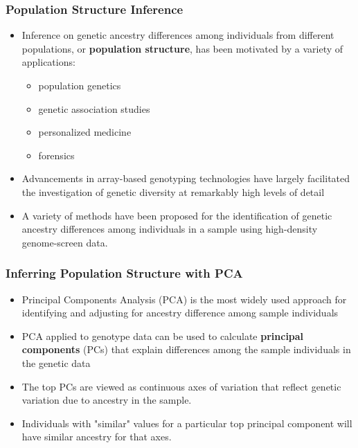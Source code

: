 \documentclass{beamer}
\begin{document}
\begin{frame}
	\frametitle{\bf Population Structure Inference}
	\begin{itemize}
		\item Inference on genetic ancestry differences among individuals from different populations, or {\bf population structure},  has been motivated by a variety of applications: 
		\begin{itemize}
			\item population genetics
			\item  genetic association studies
			\item personalized medicine
			\item forensics 
		\end{itemize}
		\item Advancements in array-based genotyping technologies have largely facilitated the investigation of genetic diversity at remarkably high levels of detail
		\item A variety of methods have been proposed for the identification of genetic ancestry differences among individuals in a sample  using high-density genome-screen data.
	\end{itemize}
\end{frame}




\begin{frame}
	\frametitle{\bf Inferring Population Structure with PCA}
	\begin{itemize}
		\item Principal Components Analysis (PCA) is the most widely used approach for identifying and adjusting for ancestry difference among sample individuals
		\item PCA applied to genotype data can be used to calculate  {\bf principal components} (PCs) that explain differences  among the sample individuals in the genetic data
		\item  The top PCs are viewed as continuous axes of variation that reflect genetic variation due to ancestry in the sample.
		\item Individuals with "similar" values for a particular top principal component will have similar ancestry for that axes.
	\end{itemize}
\end{frame}
\end{document}
